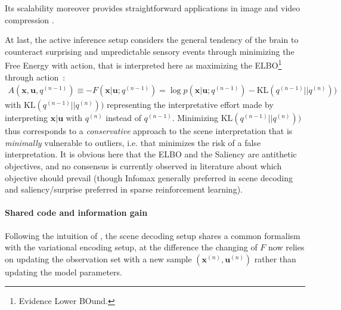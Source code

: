 \documentclass{article}
\begin{document}
Its scalability moreover provides straightforward applications in image and video compression  \cite{wang2003foveation,guo2010novel}.

At last, the  active inference setup \citep{friston2010free,friston2012perceptions} 
considers the general tendency of the brain to counteract surprising and unpredictable sensory events through minimizing the Free Energy with action, that is  interpreted here as maximizing the ELBO\footnote{Evidence Lower BOund.} through action~:
\begin{align}
A(\boldsymbol{x}, \boldsymbol{u}, q^{(n-1)}) \equiv -F(\boldsymbol{x}|\boldsymbol{u}; q^{(n-1)}) = 
\log p(\boldsymbol{x}| \boldsymbol{u}; q^{(n-1)}) - \text{KL}(q^{(n-1)}||q^{(n)}))
\label{eq:ELBO}
\end{align}
with $\text{KL}(q^{(n-1)}||q^{(n)}))$ representing the interpretative effort made by interpreting  $\boldsymbol{x}|\boldsymbol{u}$ with $q^{(n)}$ instead of $q^{(n-1)}$. Minimizing $\text{KL}(q^{(n-1)}||q^{(n)}))$ thus corresponds to a \emph{conservative} approach to the scene interpretation
that is \emph{minimally} vulnerable to outliers, i.e. that minimizes the risk of a false interpretation. It is obvious here that the ELBO and the Saliency are antithetic objectives, and no consensus is currently observed in literature about which objective should prevail (though Infomax generally preferred in scene decoding and saliency/surprise preferred in sparse reinforcement learning).





\paragraph{Shared code and information gain}
Following the intuition of \cite{friston2012perceptions}, the scene decoding setup shares a common formalism with the variational encoding setup, at the difference the changing of $F$ now relies on updating the observation set
with a new sample $(\boldsymbol{x}^{(n)}, \boldsymbol{u}^{(n)})$ rather than updating the model parameters.
\end{document}
